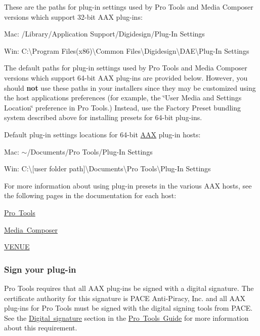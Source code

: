  These are the paths for plug-\/in settings used by Pro Tools and Media Composer versions which support 32-\/bit A\+AX plug-\/ins\+:

 
\begin{DoxyItemize}
\item Mac\+: /\+Library/\+Application Support/\+Digidesign/\+Plug-\/\+In Settings  
\item Win\+: C\+:\textbackslash{}Program Files(x86)\textbackslash{}Common Files\textbackslash{}Digidesign\textbackslash{}D\+AE\textbackslash{}Plug-\/\+In Settings  
\end{DoxyItemize}

 The default paths for plug-\/in settings used by Pro Tools and Media Composer versions which support 64-\/bit A\+AX plug-\/ins are provided below. However, you should {\bfseries{not}} use these paths in your installers since they may be customized using the host application\textquotesingle{}s preferences (for example, the \char`\"{}\+User Media and Settings Location\char`\"{} preference in Pro Tools.) Instead, use the Factory Preset bundling system described above for installing presets for 64-\/bit plug-\/ins.

 Default plug-\/in settings locations for 64-\/bit \mbox{\hyperlink{a00852}{A\+AX}} plug-\/in hosts\+:

 
\begin{DoxyItemize}
\item Mac\+: $\sim$/\+Documents/\+Pro Tools/\+Plug-\/\+In Settings  
\item Win\+: C\+:\textbackslash{}\mbox{[}user folder path\mbox{]}\textbackslash{}Documents\textbackslash{}Pro Tools\textbackslash{}Plug-\/\+In Settings  
\end{DoxyItemize}

 For more information about using plug-\/in presets in the various A\+AX hosts, see the following pages in the documentation for each host\+: 
\begin{DoxyItemize}
\item \mbox{\hyperlink{a00830_subsection__presets_and_settings_management}{Pro Tools}}  
\item \mbox{\hyperlink{a00831_subsection__aax_media_composer_guide__features__presets}{Media Composer}}  
\item \mbox{\hyperlink{a00849_subsection__aax_venue_guide__features__presets}{V\+E\+N\+UE}}  
\end{DoxyItemize}

\hypertarget{a00843_aax_distributing_finishing_signature}{}\subsubsection{Sign your plug-\/in}\label{a00843_aax_distributing_finishing_signature}
 Pro Tools requires that all A\+AX plug-\/ins be signed with a digital signature. The certificate authority for this signature is P\+A\+CE Anti-\/\+Piracy, Inc. and all A\+AX plug-\/ins for Pro Tools must be signed with the digital signing tools from P\+A\+CE. See the \mbox{\hyperlink{a00830_subsection__digital_signature_}{Digital signature}} section in the \mbox{\hyperlink{a00830}{Pro Tools Guide}} for more information about this requirement.



